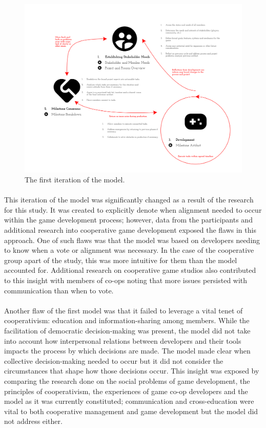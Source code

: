 \begin{figure}[h!]
    \centering
    \includegraphics[width=\linewidth]{Figures/FirstModel.png}
    \caption{The first iteration of the model.}
\end{figure}


\paragraph{} This iteration of the model was significantly changed as a result of the research for this study. It was created to explicitly denote when alignment needed to occur within the game development process; however, data from the participants and additional research into cooperative game development exposed the flaws in this approach. One of such flaws was that the model was based on developers needing to know when a vote or alignment was necessary. In the case of the cooperative group apart of the study, this was more intuitive for them than the model accounted for. Additional research on cooperative game studios also contributed to this insight with members of co-ops noting that more issues persisted with communication than when to vote.

\paragraph{} Another flaw of the first model was that it failed to leverage a vital tenet of cooperativism: education and information-sharing among members. While the facilitation of democratic decision-making was present, the model did not take into account how interpersonal relations between developers and their tools impacts the process by which decisions are made. The model made clear when collective decision-making needed to occur but it did not consider the circumstances that shape how those decisions occur. This insight was exposed by comparing the research done on the social problems of game development, the principles of cooperativism, the experiences of game co-op developers and the model as it was currently constituted; communication and cross-education were vital to both cooperative management and game development but the model did not address either.

